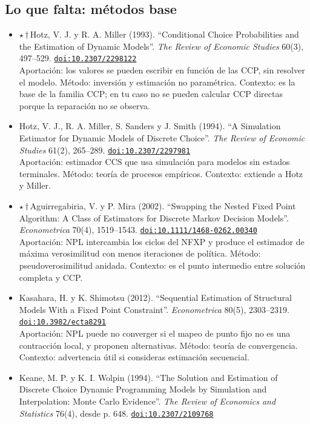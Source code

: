 \documentclass[11pt]{article}
\begin{document}
\subsection*{Lo que falta: métodos base}
\begin{itemize}
\item $\star$\,$\dagger$\,Hotz, V. J. y R. A. Miller (1993). ``Conditional Choice Probabilities and the Estimation of Dynamic Models''. \textit{The Review of Economic Studies} 60(3), 497--529. \href{https://doi.org/10.2307/2298122}{\texttt{doi:10.2307/2298122}}\\
Aportación: los valores se pueden escribir en función de las CCP, sin resolver el modelo. Método: inversión y estimación no paramétrica. Contexto: es la base de la familia CCP; en tu caso no se pueden calcular CCP directas porque la reparación no se observa.
\item Hotz, V. J., R. A. Miller, S. Sanders y J. Smith (1994). ``A Simulation Estimator for Dynamic Models of Discrete Choice''. \textit{The Review of Economic Studies} 61(2), 265--289. \href{https://doi.org/10.2307/2297981}{\texttt{doi:10.2307/2297981}}\\
Aportación: estimador CCS que usa simulación para modelos sin estados terminales. Método: teoría de procesos empíricos. Contexto: extiende a Hotz y Miller.
\item $\star$\,$\dagger$\,Aguirregabiria, V. y P. Mira (2002). ``Swapping the Nested Fixed Point Algorithm: A Class of Estimators for Discrete Markov Decision Models''. \textit{Econometrica} 70(4), 1519--1543. \href{https://doi.org/10.1111/1468-0262.00340}{\texttt{doi:10.1111/1468-0262.00340}}\\
Aportación: NPL intercambia los ciclos del NFXP y produce el estimador de máxima verosimilitud con menos iteraciones de política. Método: pseudoverosimilitud anidada. Contexto: es el punto intermedio entre solución completa y CCP.
\item Kasahara, H. y K. Shimotsu (2012). ``Sequential Estimation of Structural Models With a Fixed Point Constraint''. \textit{Econometrica} 80(5), 2303--2319. \href{https://doi.org/10.3982/ecta8291}{\texttt{doi:10.3982/ecta8291}}\\
Aportación: NPL puede no converger si el mapeo de punto fijo no es una contracción local, y proponen alternativas. Método: teoría de convergencia. Contexto: advertencia útil si consideras estimación secuencial.
\item Keane, M. P. y K. I. Wolpin (1994). ``The Solution and Estimation of Discrete Choice Dynamic Programming Models by Simulation and Interpolation: Monte Carlo Evidence''. \textit{The Review of Economics and Statistics} 76(4), desde p. 648. \href{https://doi.org/10.2307/2109768}{\texttt{doi:10.2307/2109768}}\\

\end{itemize}
\end{document}
